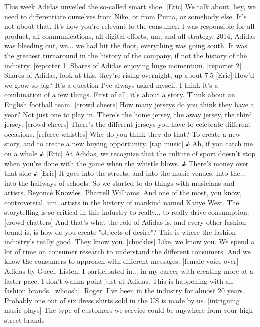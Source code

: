 \documentclass[a4paper]{article}
\begin{document}
	This week Adidas unveiled the so-called smart shoe.
	[Eric] We talk about, hey, we need to differentiate ourselves
	from Nike, or from Puma, or somebody else. It's not about that.
	It's how you're relevant to the consumer.
	I was responsible for all product, all communications,
	all digital efforts, um, and all strategy.
	2014, Adidas was bleeding out, we... we had hit the floor,
	everything was going south.
	It was the greatest turnaround in the history of the company,
	if not the history of the industry.
	[reporter 1] Shares of Adidas enjoying huge momentum.
	[reporter 2] Shares of Adidas, look at this,
	they're rising overnight, up about 7.5%
	[Eric] How'd we grow so big? It's a question I've always asked myself.
	I think it's a combination of a few things.
	First of all,
	it's about a story.
	Think about an English football team.
	[crowd cheers]
	How many jerseys do you think they have a year?
	Not just one to play in. There's the home jersey,
	the away jersey, the third jersey.
	[crowd cheers]
	There's the different jerseys you have to celebrate different occasions.
	[referee whistles]
	Why do you think they do that?
	To create a new story, and to create a new buying opportunity.
	[rap music]
	♪ Ah, if you catch me on a whale ♪
	[Eric] At Adidas, we recognize that the culture of sport
	doesn't stop when you're done with the game when the whistle blows.
	♪ There's money over that side ♪
	[Eric] It goes into the streets, and into the music venues, into the...
	into the hallways of schools.
	So we started to do things with musicians and artists.
	Beyoncé Knowles.
	Pharrell Williams.
	And one of the most, you know,
	controversial, um, artists in the history of mankind named Kanye West.
	The storytelling is so critical in this industry
	to really... to really drive consumption.
	[crowd chatters]
	And that's what the role of Adidas is, and every other fashion brand is,
	is how do you create "objects of desire"?
	This is where the fashion industry's really good. They know you.
	[chuckles] Like, we know you.
	We spend a lot of time on consumer research
	to understand the different consumers.
	And we know the consumers to approach with different messages.
	[female voice over] Adidas by Gucci.
	Listen, I participated in... in my career with creating more at a faster pace.
	I don't wanna point just at Adidas. This is happening with all fashion brands.
	[whoosh]
	[Roger] I've been in the industry for almost 20 years.
	Probably one out of six dress shirts sold in the US is made by us.
	[intriguing music plays]
	The type of customers we service could be anywhere from your high street brands
\end{document}
